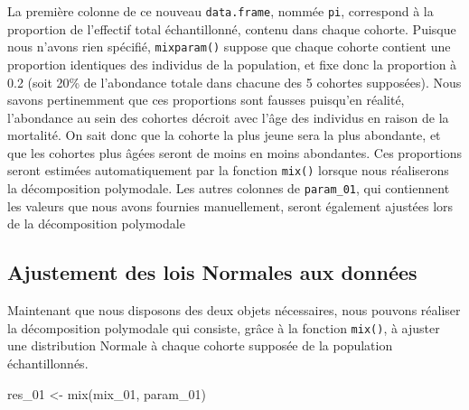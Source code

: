 \documentclass[
  a4paper,
  DIV=11,
  numbers=noendperiod,
  oneside]{scrreprt}
\newenvironment{Shaded}{}{}
\newcommand{\FunctionTok}[1]{\textcolor[rgb]{0.44,0.26,0.76}{#1}}
\newcommand{\NormalTok}[1]{\textcolor[rgb]{0.14,0.16,0.18}{#1}}
\newcommand{\OtherTok}[1]{\textcolor[rgb]{0.44,0.26,0.76}{#1}}
\begin{document}

La première colonne de ce nouveau \texttt{data.frame}, nommée
\texttt{pi}, correspond à la proportion de l'effectif total
échantillonné, contenu dans chaque cohorte. Puisque nous n'avons rien
spécifié, \texttt{mixparam()} suppose que chaque cohorte contient une
proportion identiques des individus de la population, et fixe donc la
proportion à 0.2 (soit 20\% de l'abondance totale dans chacune des 5
cohortes supposées). Nous savons pertinemment que ces proportions sont
fausses puisqu'en réalité, l'abondance au sein des cohortes décroit avec
l'âge des individus en raison de la mortalité. On sait donc que la
cohorte la plus jeune sera la plus abondante, et que les cohortes plus
âgées seront de moins en moins abondantes. Ces proportions seront
estimées automatiquement par la fonction \texttt{mix()} lorsque nous
réaliserons la décomposition polymodale. Les autres colonnes de
\texttt{param\_01}, qui contiennent les valeurs que nous avons fournies
manuellement, seront également ajustées lors de la décomposition
polymodale

\hypertarget{ajustement-des-lois-normales-aux-donnuxe9es}{%
\subsection{Ajustement des lois Normales aux
données}\label{ajustement-des-lois-normales-aux-donnuxe9es}}

Maintenant que nous disposons des deux objets nécessaires, nous pouvons
réaliser la décomposition polymodale qui consiste, grâce à la fonction
\texttt{mix()}, à ajuster une distribution Normale à chaque cohorte
supposée de la population échantillonnés.

\begin{Shaded}
\begin{Highlighting}[]
\NormalTok{res\_01 }\OtherTok{\textless{}{-}} \FunctionTok{mix}\NormalTok{(mix\_01, param\_01)}
\end{Highlighting}
\end{Shaded}
\end{document}
